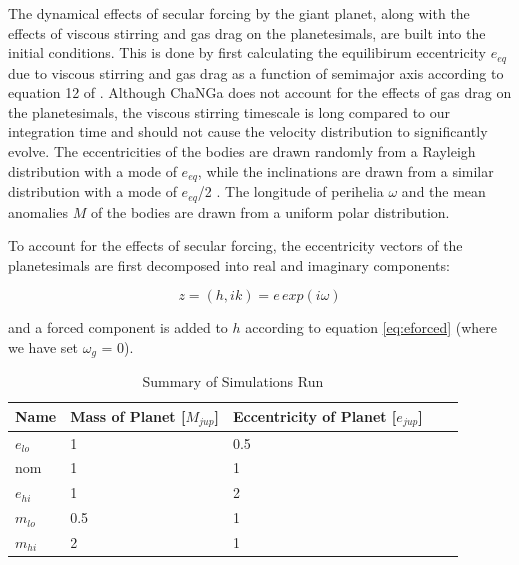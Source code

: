 \documentclass[onecolumn]{aastex63}
\begin{document}
The dynamical effects of secular forcing by the giant planet, along with  the effects of viscous stirring and gas drag on the planetesimals, are 
built into the initial conditions. This is done by first calculating the equilibirum eccentricity $e_{eq}$ due to viscous stirring and gas drag as a 
function of semimajor axis according to equation 12 of \citet{2002ApJ...581..666K}. Although {\sc ChaNGa} does not account for the effects of 
gas drag on the planetesimals, the viscous stirring timescale is long compared to our integration time and should not cause the velocity 
distribution to significantly evolve. The eccentricities of the bodies are drawn randomly from a Rayleigh distribution with a mode of $e_{eq}$, 
while the inclinations are drawn from a similar distribution with a mode of $e_{eq}$/2 \citep{1993MNRAS.263..875I}. The longitude of perihelia 
$\omega$ and the mean anomalies $M$ of the bodies are drawn from a uniform polar distribution.

To account for the effects of secular forcing, the eccentricity vectors of the planetesimals are first decomposed into real and imaginary 
components:

\begin{equation}\label{eq:hk}
	z = (h, ik) = e \, exp(i \omega)
\end{equation}

\noindent and a forced component is added to $h$ according to equation \ref{eq:eforced} (where we have set $\omega_{g}$ = 0).

\begin{table}
\begin{center}
\caption{Summary of Simulations Run}
\begin{tabular}{lllll} \hline \hline
Name     & Mass of Planet [$M_{jup}$] & Eccentricity of Planet [$e_{jup}$] &  &  \\ \hline
$e_{lo}$ & 1                      & 0.5                            &  &  \\
nom      & 1                      & 1                              &  &  \\
$e_{hi}$ & 1                      & 2                              &  &  \\
$m_{lo}$ & 0.5                    & 1                              &  &  \\
$m_{hi}$ & 2                      & 1                              &  &  \\ \hline
\end{tabular}
\label{tab:sims}
\end{center}
\end{table}
\end{document}
